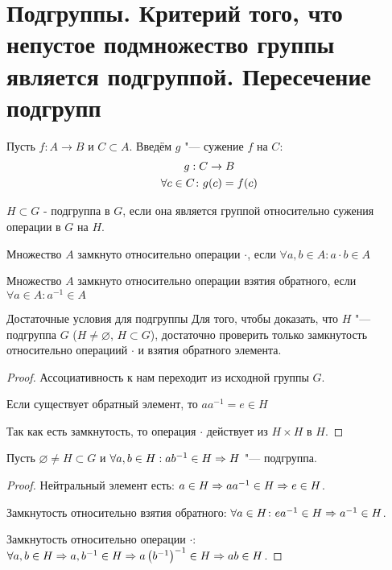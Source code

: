 \section{Подгруппы. Критерий того, что непустое подмножество группы является подгруппой. Пересечение подгрупп}
\begin{Def}
	Пусть $f: A \to B$ и $C \subset A$. Введём $g$ "--- сужение $f$ на $C$:
	\begin{gather*}
	g: C \rightarrow B \\
	\forall c \in C\colon g(c) = f(c)
	\end{gather*}
\end{Def}

\begin{Def}
	$H \subset G$ - подгруппа в $G$, если она является группой относительно сужения операции в $G$ на $H$.
\end{Def}


\begin{Def}
	Множество $A$ замкнуто относительно операции $\cdot$, если $\forall a, b \in A \colon a \cdot b \in A$

	Множество $A$ замкнуто относительно операции взятия обратного, если $\forall a \in A \colon a^{-1} \in A$ \\
\end{Def}

\begin{theorem}{Достаточные условия для подгруппы}
Для того, чтобы доказать, что $H$ "--- подгруппа $G$ ($H \neq \varnothing$, $H \subset G$), достаточно проверить только замкнутость относительно операциий $\cdot$ и взятия обратного элемента. \\
\end{theorem}
\begin{proof}
Ассоциативность к нам переходит из исходной группы $G$.

Если существует обратный элемент, то $a a^{-1} = e \in H$

Так как есть замкнутость, то операция $\cdot$ действует из $H \times H$ в $H$.
\end{proof}

\begin{conseq}
Пусть $\varnothing \ne H \subset G$ и $\forall a, b \in H: ab^{-1} \in H \Rightarrow H$ "--- подгруппа.  
\end{conseq}
\begin{proof}
Нейтральный элемент есть: $a \in H \Rightarrow aa^{-1} \in H \Rightarrow e \in H$.

Замкнутость относительно взятия обратного: $\forall a \in H \colon ea^{-1} \in H \Rightarrow a^{-1} \in H$.

Замкнутость относительно операции $\cdot$: $\forall a, b \in H \Rightarrow a, b^{-1} \in H \Rightarrow a\left(b^{-1}\right)^{-1} \in H \Rightarrow ab \in H$.
\end{proof}

